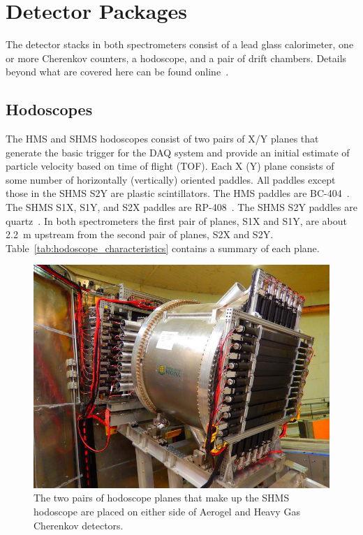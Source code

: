 \section{Detector Packages}
The detector stacks in both spectrometers consist of a lead glass calorimeter,
one or more Cherenkov counters, a hodoscope, and a pair of drift chambers.
Details beyond what are covered here can be found
online~\cite{Standard_Equipment_Manual}.

\subsection{Hodoscopes}

The HMS and SHMS hodoscopes consist of two pairs of X/Y planes
that generate the basic trigger for the DAQ system and provide an initial
estimate of particle velocity based on time of flight (TOF).
Each X (Y) plane consists of some number of horizontally (vertically) oriented
paddles.
All paddles except those in the SHMS S2Y are plastic scintillators.
The HMS paddles are BC-404~\cite{Standard_Equipment_Manual,BC404}.
The SHMS S1X, S1Y, and S2X paddles are RP-408~\cite{SHMS_hodo_plastic,RP408}.
The SHMS S2Y paddles are quartz~\cite{SHMS_hodo_quartz}.
In both spectrometers the first pair of planes, S1X and S1Y, are
about \SI{2.2}{m} upstream from the second pair of planes, S2X and S2Y.
Table~\ref{tab:hodoscope_characteristics} contains a summary of each plane.

\begin{figure}[!h]
    \centering
    \includegraphics[width=1.0\textwidth]{chap3/shms_hodoscope.png}
    \caption{The two pairs of hodoscope planes that make up the SHMS
             hodoscope are placed on either side of Aerogel and Heavy Gas
             Cherenkov detectors.}
    \label{fig:shms_hodoscope}
\end{figure}

